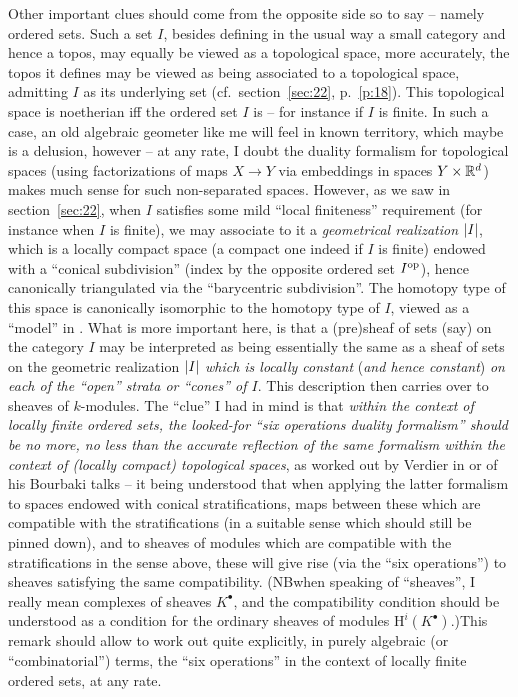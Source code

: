 Other important clues should come from the opposite side so to say --
namely ordered sets. Such a set $I$, besides defining in the usual way
a small category and hence a topos, may equally be viewed as a
topological space, more accurately, the topos it defines may be viewed
as being associated to a topological space, admitting $I$ as its
underlying set (cf.\ section~\ref{sec:22}, p.~\ref{p:18}). This
topological space is noetherian if{f} the ordered set $I$ is -- for
instance if $I$ is finite. In such a case, an old algebraic geometer
like me will feel in known territory, which maybe is a delusion,
however -- at any rate, I doubt the duality formalism for topological
spaces (using factorizations of maps $X\to Y$ via embeddings in spaces
$Y\times{\ensuremath{\mathbb{R}}}^d$) makes much sense for such non-separated
spaces. However, as we saw in section~\ref{sec:22}, when $I$ satisfies
some mild ``local finiteness'' requirement (for instance when $I$ is
finite), we may associate to it a \emph{geometrical realization} $\lvert I\rvert$, which is a locally compact space (a compact one indeed if $I$ is
finite) endowed with a ``conical subdivision'' (index by the opposite
ordered set $I^{\mathrm{op}}$), hence canonically triangulated via the
``barycentric subdivision''. The homotopy type of this space is
canonically isomorphic to the homotopy type of $I$, viewed as a
``model'' in \Cat. What is more important here, is that a (pre)sheaf
of sets (say) on the category $I$ may be interpreted as being
essentially the same as a sheaf of sets on the geometric realization
$\lvert I\rvert$ \emph{which is locally constant} (\emph{and hence constant})
\emph{on each of the \emph{``open''} strata or ``cones'' of $I$}. This
description then carries over to sheaves of $k$-modules. The ``clue''
I had in mind is that \emph{within the context of locally finite
  ordered sets, the looked-for ``six operations duality formalism''
  should be no more, no less than the accurate reflection of the same
  formalism within the context of \textup(locally
  compact\textup) topological spaces}, as worked out by Verdier in or
of his Bourbaki talks -- it being understood that when applying the
latter formalism to spaces endowed with conical stratifications, maps
between these which are compatible with the stratifications (in a
suitable sense which should still be pinned down), and to sheaves of
modules which are compatible with the stratifications in the sense
above, these will give rise (via the ``six operations'') to sheaves
satisfying the same compatibility. (NB\enspace when speaking of
``sheaves'', I really mean complexes of sheaves $K^\bullet$, and the
compatibility condition should be understood as a condition for the
ordinary sheaves of modules $\mathrm H^i(K^\bullet)$.)\enspace This
remark should allow to work out quite explicitly, in purely algebraic
(or ``combinatorial'') terms, the ``six operations'' in the context of
locally finite ordered sets, at any rate.

